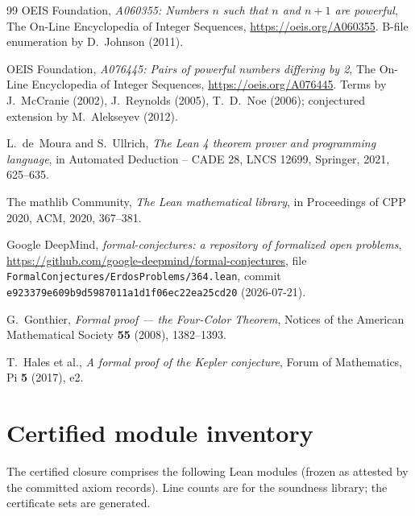 \documentclass[11pt]{article}
\theoremstyle{definition}
\theoremstyle{remark}
\newcommand{\code}[1]{\texttt{#1}}
\begin{document}
\begin{thebibliography}{99}
OEIS Foundation,
\emph{A060355: Numbers $n$ such that $n$ and $n+1$ are powerful},
The On-Line Encyclopedia of Integer Sequences,
\url{https://oeis.org/A060355}. B-file enumeration by D.~Johnson (2011).

OEIS Foundation,
\emph{A076445: Pairs of powerful numbers differing by 2},
The On-Line Encyclopedia of Integer Sequences,
\url{https://oeis.org/A076445}. Terms by J.~McCranie (2002),
J.~Reynolds (2005), T.~D.~Noe (2006); conjectured extension by
M.~Alekseyev (2012).

L.~de~Moura and S.~Ullrich,
\emph{The Lean 4 theorem prover and programming language},
in Automated Deduction -- CADE 28, LNCS 12699, Springer, 2021, 625--635.

The mathlib Community,
\emph{The Lean mathematical library},
in Proceedings of CPP 2020, ACM, 2020, 367--381.

Google DeepMind,
\emph{formal-conjectures: a repository of formalized open problems},
\url{https://github.com/google-deepmind/formal-conjectures},
file \code{FormalConjectures/ErdosProblems/364.lean},
commit \code{e923379e609b9d5987011a1d1f06ec22ea25cd20} (2026-07-21).

G.~Gonthier,
\emph{Formal proof --- the Four-Color Theorem},
Notices of the American Mathematical Society \textbf{55} (2008),
1382--1393.

T.~Hales et al.,
\emph{A formal proof of the Kepler conjecture},
Forum of Mathematics, Pi \textbf{5} (2017), e2.

\end{thebibliography}

\appendix

\section{Certified module inventory}\label{app:modules}

The certified closure comprises the following Lean modules (frozen as
attested by the committed axiom records). Line counts are for the
soundness library; the certificate sets are generated.
\end{document}
